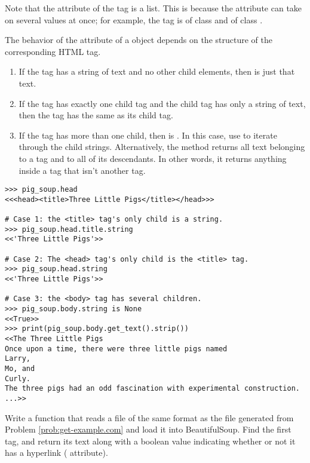 Note that the  attribute of the  tag is a list.
This is because the  attribute can take on several values at once; for example, the tag  is of class  and of class .

The behavior of the  attribute of a  object depends on the structure of the corresponding HTML tag.
\begin{enumerate}
    \item If the tag has a string of text and no other child elements, then  is just that text.
    \item If the tag has exactly one child tag and the child tag has only a string of text, then the tag has the same  as its child tag.
    \item If the tag has more than one child, then  is .
    In this case, use  to iterate through the child strings.
    Alternatively, the  method returns all text belonging to a tag and to all of its descendants.
    In other words, it returns anything inside a tag that isn't another tag.
\end{enumerate}

\begin{lstlisting}
>>> pig_soup.head
<<<head><title>Three Little Pigs</title></head>>>

# Case 1: the <title> tag's only child is a string.
>>> pig_soup.head.title.string
<<'Three Little Pigs'>>

# Case 2: The <head> tag's only child is the <title> tag.
>>> pig_soup.head.string
<<'Three Little Pigs'>>

# Case 3: the <body> tag has several children.
>>> pig_soup.body.string is None
<<True>>
>>> print(pig_soup.body.get_text().strip())
<<The Three Little Pigs
Once upon a time, there were three little pigs named
Larry,
Mo, and
Curly.
The three pigs had an odd fascination with experimental construction.
...>>
\end{lstlisting}

\begin{problem} %
Write a function that reads a file of the same format as the file generated from Problem \ref{prob:get-example.com} and load it into BeautifulSoup.
Find the first  tag, and return its text along with a boolean value indicating whether or not it has a hyperlink ( attribute).
\end{problem}

